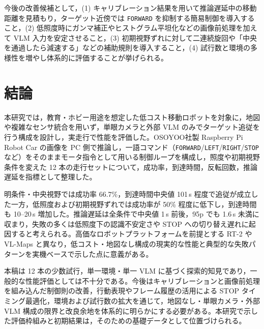 \documentclass[a4paper,11pt]{ltjsreport}
\begin{document}
今後の改善候補として，(1) キャリブレーション結果を用いて推論遅延中の移動距離を見積もり，ターゲット近傍では \texttt{FORWARD} を抑制する簡易制御を導入すること，(2) 低照度時にガンマ補正やヒストグラム平坦化などの画像前処理を加えて VLM 入力を安定させること，(3) 初期視野ずれに対して二連続旋回や「中央を通過したら減速する」などの補助規則を導入すること，(4) 試行数と環境の多様性を増やし体系的に評価することが挙げられる。

\chapter{結論}
\label{chap:conclusion}
本研究では，教育・ホビー用途を想定した低コスト移動ロボットを対象に，地図や複雑なセンサ統合を用いず，単眼カメラと外部 VLM のみでターゲット追従を行う構成を設計し，実走行で性能を評価した。OSOYOO社製 Raspberry Pi Robot Car の画像を PC 側で推論し，一語コマンド（\texttt{FORWARD}/\texttt{LEFT}/\texttt{RIGHT}/\texttt{STOP} など）をそのままモータ指令として用いる制御ループを構成し，照度や初期視野条件を変えた 12 本の走行セットについて，成功率，到達時間，反転回数，推論遅延を指標として整理した。

明条件・中央視野では成功率 66.7\%，到達時間中央値 101\,s 程度で追従が成立した一方，低照度および初期視野ずれでは成功率が 50\% 程度に低下し，到達時間も 10--20\,s 増加した。推論遅延は全条件で中央値 1\,s 前後，95p でも 1.6\,s 未満に収まり，失敗の多くは低照度下の認識不安定さや STOP への切り替え遅れに起因すると考えられる。高価なロボットプラットフォームを前提とする RT-2 や VL-Maps と異なり，低コスト・地図なし構成の現実的な性能と典型的な失敗パターンを実機ベースで示した点に意義がある。

本稿は 12 本の少数試行，単一環境・単一 VLM に基づく探索的知見であり，一般的な性能評価としては不十分である。今後はキャリブレーションと画像前処理を組み込んだ制御則の改善，行動表現やフレーム履歴の活用による STOP タイミング最適化，環境および試行数の拡大を通じて，地図なし・単眼カメラ・外部 VLM 構成の限界と改良余地を体系的に明らかにする必要がある。本研究で示した評価枠組みと初期結果は，そのための基礎データとして位置づけられる。




\end{document}
